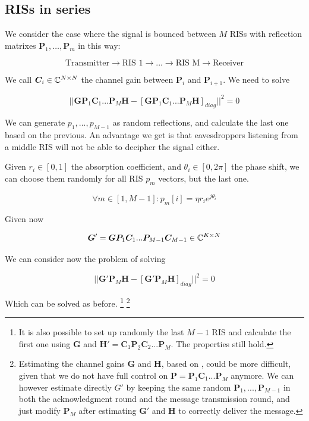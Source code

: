 \subsection{RISs in series}

We consider the case where the signal is bounced between $M$ RISs with reflection matrixes $\bm{P}_1, \ldots, \bm{P}_m$ in this way:

\begin{equation}
  \text{Transmitter} \rightarrow \text{RIS 1} \rightarrow ... \rightarrow \text{RIS M} \rightarrow \text{Receiver}
\end{equation}

We call $\bm{C}_i \in \mathbb{C}^{N \times N}$ the channel gain between $\bm{P}_i$ and $\bm{P}_{i+1}$. We need to solve

\begin{equation}
  || \bm{GP}_1\bm{C}_1...\bm{P}_M\bm{H} - [\bm{GP}_1\bm{C}_1...\bm{P}_M\bm{H}]_{diag} || ^2 = 0
\end{equation}

We can generate $p_1, ..., p_{M-1}$ as random reflections, and calculate the last one based on the previous. An advantage we get is that eavesdroppers listening from a middle RIS will not be able to decipher the signal either.

Given $r_i \in [0, 1]$ the absorption coefficient, and $\theta_i \in [0, 2\pi]$ the phase shift, we can choose them randomly for all RIS $p_m$ vectors, but the last one.

\begin{equation}
  \forall m \in [1, M-1] : p_m[i] = \eta r_i e^{j\theta_i}
\end{equation}

Given now

\begin{equation}
  \bm{G}' = \bm{GP}_1\bm{C}_1...\bm{P}_{M-1}\bm{C}_{M-1} \in \mathbb{C}^{K \times N}
\end{equation}

We can consider now the problem of solving

\begin{equation}
  || \bm{G}'\bm{P}_M\bm{H} - [\bm{G}'\bm{P}_M\bm{H}]_{diag} || ^2 = 0
\end{equation}

Which can be solved as before.
\footnote{It is also possible to set up randomly the last $M-1$ RIS and calculate the first one using $\bm{G}$ and $\bm{H}'=\bm{C}_1\bm{P}_2\bm{C}_2...\bm{P}_M$. The properties still hold.}
\footnote{Estimating the channel gains $\bm{G}$ and $\bm{H}$, based on \cite{8879620}, could be more difficult, given that we do not have full control on $\bm{P}=\bm{P}_1\bm{C}_1...\bm{P}_M$ anymore. We can however estimate directly $G'$ by keeping the same random $\bm{P}_1, ..., \bm{P}_{M-1}$ in both the acknowledgment round and the message transmission round, and just modify $\bm{P}_M$ after estimating $\bm{G}'$ and $\bm{H}$ to correctly deliver the message.}

